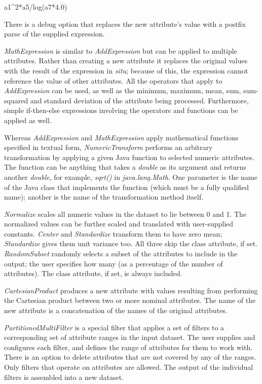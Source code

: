 a1\string^2*a5/log(a7*4.0)\newline

There is a debug option that replaces the new attribute's value with a
postfix parse of the supplied expression.  

\textit{MathExpression} is similar to \textit{AddExpression} but can
be applied to multiple attributes. Rather than creating a new
attribute it replaces the original values with the result of the
expression in \textit{situ}; because of this, the expression cannot
reference the value of other attributes. All the operators that apply
to \textit{AddExpression} can be used, as well as the minimum,
maximum, mean, sum, sum-squared and standard deviation of the
attribute being processed. Furthermore, simple if-then-else
expressions involving the operators and functions can be applied as
well.

Whereas \textit{AddExpression} and \textit{MathExpression} apply
mathematical functions specified in textual form,
\textit{NumericTransform} performs an arbitrary transformation by
applying a given Java function to selected numeric attributes. The
function can be anything that takes a \textit{double} as its argument
and returns another \textit{double}, for example, \textit{sqrt()} in
\textit{java.lang.Math}. One parameter is the name of the Java class that
implements the function (which must be a fully qualified name);
another is the name of the transformation method itself.

\textit{Normalize} scales all numeric values in the dataset to lie
between 0 and 1. The normalized values can be further scaled and
translated with user-supplied constants. \textit{Center} and
\textit{Standardize} transform them to have zero mean; \textit{Standardize}
gives them unit variance too. All three skip the class attribute, if
set. \textit{RandomSubset} randomly selects a subset of the attributes to
include in the output; the user specifies how many (as a percentage of
the number of attributes). The class attribute, if set, is always
included.

\textit{CartesianProduct} produces a new attribute with values
resulting from performing the Cartesian product between two or more
nominal attributes. The name of the new attribute is a concatenation
of the names of the original attributes.

\textit{PartitionedMultiFilter} is a special filter that applies a set
of filters to a corresponding set of attribute ranges in the input
dataset. The user supplies and configures each filter, and defines the
range of attributes for them to work with. There is an option to
delete attributes that are not covered by any of the ranges. Only
filters that operate on attributes are allowed. The output of the
individual filters is assembled into a new dataset. 

